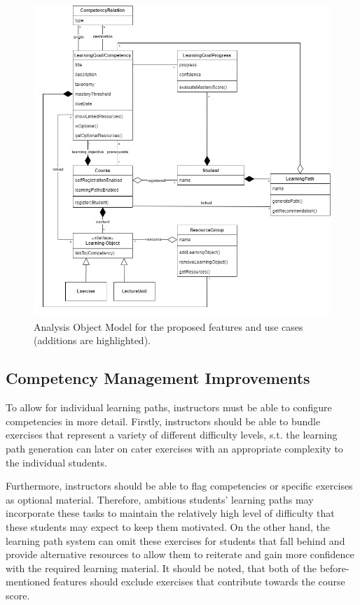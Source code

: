 \documentclass[a4paper,12pt,twoside]{article}
\begin{document}
\begin{figure}[h!]
        \centering
        \includegraphics[width=\linewidth]{figures/ObjectModel (3).jpg}
        \caption{Analysis Object Model for the proposed features and use cases (additions are highlighted).}
        \label{fig:AOM}
\end{figure}

\subsection{Competency Management Improvements}
To allow for individual learning paths, instructors must be able to configure competencies in more detail. Firstly, instructors should be
able to bundle exercises that represent a variety of different difficulty levels, s.t. the learning path generation can later on cater exercises
with an appropriate complexity to the individual students.

Furthermore, instructors should be able to flag competencies or specific exercises as optional material. Therefore, ambitious students' learning paths
may incorporate these tasks to maintain the relatively high level of difficulty that these students may expect to keep them motivated.
On the other hand, the learning path system can omit these exercises for students that fall behind and provide alternative resources to allow them
to reiterate and gain more confidence with the required learning material.
It should be noted, that both of the before-mentioned features should exclude exercises that contribute towards the course score.
\end{document}
